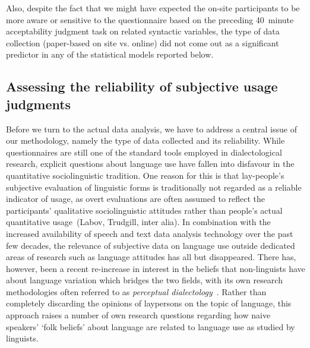 Also, despite the fact that we might have expected the on-site participants to be more aware or sensitive to the questionnaire based on the preceding 40~minute acceptability judgment task on related syntactic variables, the type of data collection (paper-based on site vs. online) did not come out as a significant predictor in any of the statistical models reported below.


\subsection{Assessing the reliability of subjective usage judgments}\label{sec:judgmentcorrelation}

Before we turn to the actual data analysis, we have to address a central issue of our methodology, namely the type of data collected and its reliability. While questionnaires are still one of the standard tools employed in dialectological research, explicit questions about language use have fallen into disfavour in the quantitative sociolinguistic tradition. One reason for this is that lay-people's subjective evaluation of linguistic forms is traditionally not regarded as a reliable indicator of usage, as overt evaluations are often assumed to reflect the participants' qualitative sociolinguistic attitudes rather than people's actual quantitative usage~(Labov, Trudgill, inter alia).
In combination with the increased availability of speech and text data analysis technology over the past few decades, the relevance of subjective data on language use outside dedicated areas of research such as language attitudes has all but disappeared.
There has, however, been a recent re-increase in interest in the beliefs that non-linguists have about language variation which bridges the two fields, with its own research methodologies often referred to as \emph{perceptual dialectology}~\citep{Montgomery2011}. %
Rather than completely discarding the opinions of laypersons on the topic of language, this approach raises a number of own research questions regarding how naive speakers' `folk beliefs' about language are related to language use as studied by linguists.

